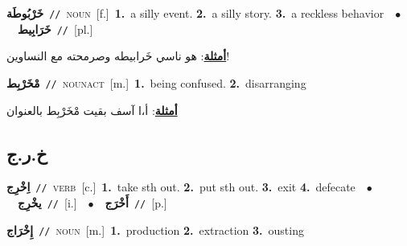 \documentclass[10pt,a4paper,twoside]{article} %
\begin{document}
\begin{multicols}{2}
{{{{{{{{{{{{\setlength\topsep{0pt}\textbf{\foreignlanguage{arabic}{خَرْبُوطَة}}\ {\color{gray}\texttt{//}\color{black}}\ \textsc{noun}\ [f.]\ \textbf{1.}~a silly event.  \textbf{2.}~a silly story.  \textbf{3.}~a reckless behavior\ \ $\bullet$\ \ \setlength\topsep{0pt}\textbf{\foreignlanguage{arabic}{خَرَابِيط}}\ {\color{gray}\texttt{//}\color{black}}\ [pl.]\  \begin{flushright}\color{gray}\foreignlanguage{arabic}{\textbf{\underline{\foreignlanguage{arabic}{أمثلة}}}: هو ناسي خَرابيطه وصرمحته مع النساوين!}\end{flushright}\color{black}} \vspace{2mm}

{\setlength\topsep{0pt}\textbf{\foreignlanguage{arabic}{مْخَرْبِط}}\ {\color{gray}\texttt{//}\color{black}}\ \textsc{noun\textunderscore act}\ [m.]\ \textbf{1.}~being confused.  \textbf{2.}~disarranging\  \begin{flushright}\color{gray}\foreignlanguage{arabic}{\textbf{\underline{\foreignlanguage{arabic}{أمثلة}}}: أ،ا آسف بقيت مْخَرْبِط بالعنوان}\end{flushright}\color{black}} \vspace{2mm}

\vspace{-3mm}
\subsection*{\color{blue}\foreignlanguage{arabic}{خ.ر.ج}\color{blue}{}} 

{\setlength\topsep{0pt}\textbf{\foreignlanguage{arabic}{اِخْرِج}}\ {\color{gray}\texttt{//}\color{black}}\ \textsc{verb}\ [c.]\ \textbf{1.}~take sth out.  \textbf{2.}~put sth out.  \textbf{3.}~exit  \textbf{4.}~defecate\ \ $\bullet$\ \ \setlength\topsep{0pt}\textbf{\foreignlanguage{arabic}{يخْرِج}}\ {\color{gray}\texttt{//}\color{black}}\ [i.]\ \ $\bullet$\ \ \setlength\topsep{0pt}\textbf{\foreignlanguage{arabic}{أَخْرَج}}\ {\color{gray}\texttt{//}\color{black}}\ [p.]\ 

{\setlength\topsep{0pt}\textbf{\foreignlanguage{arabic}{إِخْرَاج}}\ {\color{gray}\texttt{//}\color{black}}\ \textsc{noun}\ [m.]\ \textbf{1.}~production  \textbf{2.}~extraction  \textbf{3.}~ousting\ 

}}}}}}}}}}}}}
\end{multicols}
\end{document}

